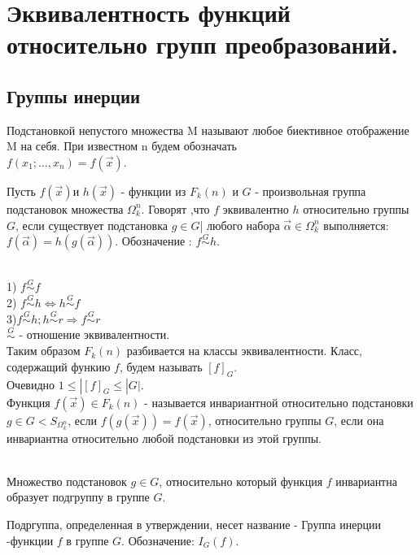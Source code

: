 \section{Эквивалентность функций относительно групп преобразований.}

\subsection{Группы инерции}

\opr 
Подстановкой непустого множества M называют любое биективное отображение M на себя. При известном n будем обозначать\\ $f(x_1; \dotsc, x_n)=f(\vec{x})$.

\opr 
Пусть $f(\vec{x}) $и $h(\vec{x})$ - функции из $F_k(n)$ и $G$ - произвольная группа подстановок множества $\Omega_k^n$. Говорят ,что $f$ эквивалентно $h$ относительно группы $G$, если существует подстановка $g \in G $| любого набора $\vec{\alpha} \in \Omega_k^n$ выполняется: $f(\vec{\alpha})=h(g(\vec{\alpha}))$. Обозначение : $f \stackrel{G}{\sim} h$.
 
\utv \\
1) $f \stackrel{G}{\sim} f$ \\
2) $f \stackrel{G}{\sim} h \Leftrightarrow h \stackrel{G}{\sim} f$ \\
3)$f \stackrel{G}{\sim} h;h \stackrel{G}{\sim} r \Rightarrow f \stackrel{G}{\sim} r$\\

$\stackrel{G}{\sim}$ - отношение эквивалентности.\\

Таким образом $F_k(n) $ разбивается на классы эквивалентности. Класс, содержащий функию $f$,  будем называть $[f]_G$. \\
Очевидно $1\leq|[f]_G\leq|G|$.\\


\opr 
Функция $f(\vec{x}) \in F_k(n) $ - называется инвариантной относительно подстановки $g \in G < S_{\Omega_k^n}$, если $f(g(\vec{x})) = f(\vec{x})$, относительно группы $G$, если она инвариантна относительно любой подстановки из этой группы.

\utv \\
Множество подстановок $g \in G$, относительно который функция $f$ инвариантна образует подгруппу в группе $G$.

\opr 
Подргуппа, определенная в утверждении, несет название - Группа инерции -функции $f$ в группе $G$. Обозначение: $I_G(f)$.

